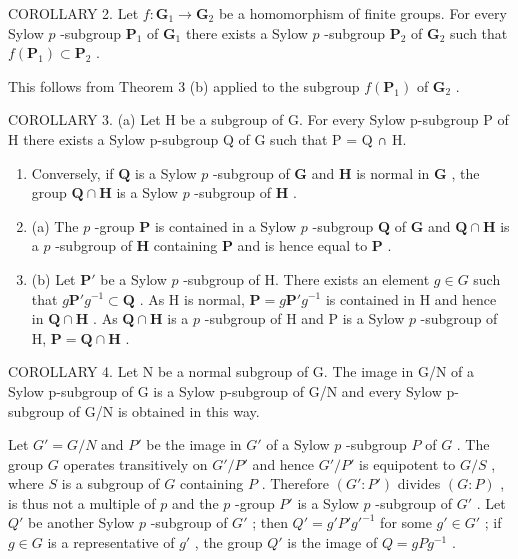 COROLLARY 2. Let \(f: \mathbf{G}_{1} \to \mathbf{G}_{2}\) be a homomorphism of finite groups. For every Sylow \(p\) -subgroup \(\mathbf{P}_{1}\) of \(\mathbf{G}_{1}\) there exists a Sylow \(p\) -subgroup \(\mathbf{P}_{2}\) of \(\mathbf{G}_{2}\) such that \(f(\mathbf{P}_{1}) \subset \mathbf{P}_{2}\) .

This follows from Theorem 3 (b) applied to the subgroup \(f(\mathbf{P}_1)\) of \(\mathbf{G}_2\) .

COROLLARY 3. (a) Let H be a subgroup of G. For every Sylow p-subgroup P of H there exists a Sylow p-subgroup Q of G such that P = Q ∩ H.

\begin{enumerate}
\def\labelenumi{(\alph{enumi})}
\setcounter{enumi}{1}
\item
  Conversely, if \(\mathbf{Q}\) is a Sylow \(p\) -subgroup of \(\mathbf{G}\) and \(\mathbf{H}\) is normal in \(\mathbf{G}\) , the group \(\mathbf{Q} \cap \mathbf{H}\) is a Sylow \(p\) -subgroup of \(\mathbf{H}\) .
\item
  (a) The \(p\) -group \(\mathbf{P}\) is contained in a Sylow \(p\) -subgroup \(\mathbf{Q}\) of \(\mathbf{G}\) and \(\mathbf{Q} \cap \mathbf{H}\) is a \(p\) -subgroup of \(\mathbf{H}\) containing \(\mathbf{P}\) and is hence equal to \(\mathbf{P}\) .
\item
  (b) Let \(\mathbf{P}'\) be a Sylow \(p\) -subgroup of H. There exists an element \(g \in G\) such that \(g\mathbf{P}'g^{-1} \subset \mathbf{Q}\) . As H is normal, \(\mathbf{P} = g\mathbf{P}'g^{-1}\) is contained in H and hence in \(\mathbf{Q} \cap \mathbf{H}\) . As \(\mathbf{Q} \cap \mathbf{H}\) is a \(p\) -subgroup of H and P is a Sylow \(p\) -subgroup of H, \(\mathbf{P} = \mathbf{Q} \cap \mathbf{H}\) .
\end{enumerate}

COROLLARY 4. Let N be a normal subgroup of G. The image in G/N of a Sylow p-subgroup of G is a Sylow p-subgroup of G/N and every Sylow p-subgroup of G/N is obtained in this way.

Let \(G' = G/N\) and \(P'\) be the image in \(G'\) of a Sylow \(p\) -subgroup \(P\) of \(G\) . The group \(G\) operates transitively on \(G'/P'\) and hence \(G'/P'\) is equipotent to \(G/S\) , where \(S\) is a subgroup of \(G\) containing \(P\) . Therefore \((G':P')\) divides \((G:P)\) , is thus not a multiple of \(p\) and the \(p\) -group \(P'\) is a Sylow \(p\) -subgroup of \(G'\) . Let \(Q'\) be another Sylow \(p\) -subgroup of \(G'\) ; then \(Q' = g'P'g'^{-1}\) for some \(g' \in G'\) ; if \(g \in G\) is a representative of \(g'\) , the group \(Q'\) is the image of \(Q = gPg^{-1}\) .

